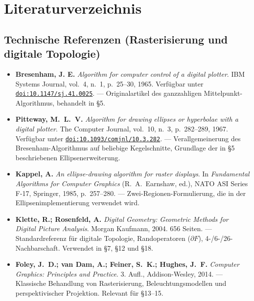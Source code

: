 \documentclass[12pt,a4paper]{scrartcl}
\newcommand{\biblink}[2]{\href{#1}{\nolinkurl{#2}}}
\begin{document}
\section*{\color{accent}Literaturverzeichnis}
\label{sec:bib}

\subsection*{Technische Referenzen (Rasterisierung und digitale Topologie)}

\begin{itemize}[leftmargin=1.4em,itemsep=0.3em,topsep=0.3em]
  \item \textbf{Bresenham, J. E.} \emph{Algorithm for computer control of a digital plotter}.
        IBM Systems Journal, vol.~4, n.~1, p.~25--30, 1965.
        Verfügbar unter \biblink{https://doi.org/10.1147/sj.41.0025}{doi:10.1147/sj.41.0025}.
        --- Originalartikel des ganzzahligen Mittelpunkt-Algorithmus, behandelt in §5.

  \item \textbf{Pitteway, M.~L.~V.} \emph{Algorithm for drawing ellipses or hyperbolae
        with a digital plotter}. The Computer Journal, vol.~10, n.~3, p.~282--289, 1967.
        Verfügbar unter \biblink{https://doi.org/10.1093/comjnl/10.3.282}{doi:10.1093/comjnl/10.3.282}.
        --- Verallgemeinerung des Bresenham-Algorithmus auf beliebige Kegelschnitte, Grundlage der in §5 beschriebenen Ellipsenerweiterung.

  \item \textbf{Kappel, A.} \emph{An ellipse-drawing algorithm for raster displays}.
        In \emph{Fundamental Algorithms for Computer Graphics} (R.~A.~Earnshaw, ed.),
        NATO ASI Series F-17, Springer, 1985, p.~257--280.
        --- Zwei-Regionen-Formulierung, die in der Ellipsenimplementierung verwendet wird.

  \item \textbf{Klette, R.; Rosenfeld, A.} \emph{Digital Geometry: Geometric Methods
        for Digital Picture Analysis}. Morgan Kaufmann, 2004. 656 Seiten.
        --- Standardreferenz für digitale Topologie, Randoperatoren ($\partial F$), 4-/6-/26-Nachbarschaft. Verwendet in §7, §12 und §18.

  \item \textbf{Foley, J.~D.; van Dam, A.; Feiner, S.~K.; Hughes, J.~F.}
        \emph{Computer Graphics: Principles and Practice}. 3. Aufl., Addison-Wesley, 2014.
        --- Klassische Behandlung von Rasterisierung, Beleuchtungsmodellen und perspektivischer Projektion. Relevant für §13--15.
\end{itemize}
\end{document}
